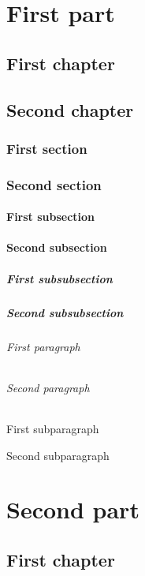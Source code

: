 \documentclass[noprint,nocopyright,baselinegrid]{uit-thesis-test}
\begin{document}
\frontmatter
\tableofcontents

\mainmatter

\part{First part}
\chapter{First chapter}
\chapter{Second chapter}
\section{First section}
\section{Second section}
\subsection{First subsection}
\subsection{Second subsection}
\subsubsection{First subsubsection}
\subsubsection{Second subsubsection}
\paragraph{First paragraph}
\paragraph{Second paragraph}
\subparagraph{First subparagraph}
\subparagraph{Second subparagraph}

\part{Second part}
\chapter{First chapter}
\end{document}
